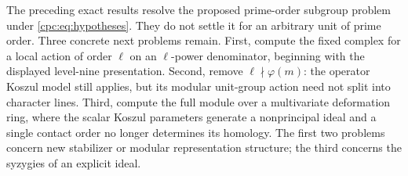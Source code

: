 The preceding exact results resolve the proposed prime-order subgroup
problem under \eqref{cpc:eq:hypotheses}. They do not settle it for an
arbitrary unit of prime order. Three concrete next problems remain.
First, compute the fixed complex for a local action of order $\ell$
on an $\ell$-power denominator, beginning with the displayed level-nine
presentation. Second, remove $\ell\nmid\varphi(m)$: the operator
Koszul model still applies, but its modular unit-group action need
not split into character lines. Third, compute the full module over
a multivariate deformation ring, where the scalar Koszul parameters
generate a nonprincipal ideal and a single contact order no longer
determines its homology. The first two problems concern new
stabilizer or modular representation structure; the third concerns
the syzygies of an explicit ideal.
